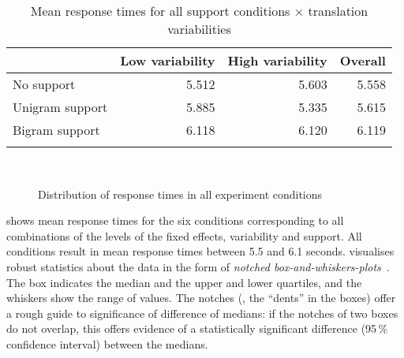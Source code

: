 \documentclass[output=paper]{LSP/langsci}
\begin{document}
\begin{table}%
   \begin{tabular*}{\textwidth}{@{\extracolsep{\fill}}lrrr@{}}
     \lsptoprule
     & Low variability & High variability & Overall\\
     \midrule
     No support & 5.512 & 5.603 & 5.558\\
     Unigram support & 5.885 & 5.335 & 5.615\\
     Bigram support & 6.118 & 6.120 & 6.119\\
    \lspbottomrule
  \end{tabular*}
  \caption{Mean response times for all support conditions $\times$ translation variabilities}
  \label{tab:rt-table}
\end{table}


\begin{figure}%
  \hfill
  \\
  \centering
  \caption{Distribution of response times in all experiment conditions 
}
\label{fig:rt-boxplots}
\end{figure}


 shows mean response times for the six
conditions corresponding to all combinations of the levels of the
fixed effects, variability and support. All conditions result in mean
response times between 5.5 and 6.1
seconds.  visualises robust statistics
about the data in the form of \textit{notched
  box-and-whiskers-plots}~\citep{mcgill78:_variat_of_box_plots}. The
box indicates the median and the upper and lower quartiles, and the
whiskers show the range of values.
The notches (\ie, the ``dents'' in the boxes) offer a rough guide to
significance of difference of medians: if the notches of two boxes do
not overlap, this offers evidence of a statistically significant
difference (95\,\% confidence interval) between the medians.
\end{document}
